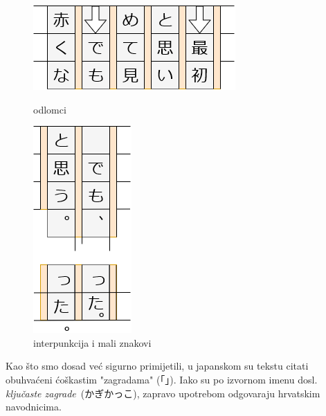 	\begin{figure}[h]
		\centering
		\begin{minipage}{.45\textwidth}
			\centering
			\includegraphics[width=.9\textwidth]{017_pisanje_res/a3.png}
			\caption{odlomci}
		\end{minipage}
		\begin{minipage}{.45\textwidth}
			\centering
			\includegraphics[width=.45\textwidth]{017_pisanje_res/a5.png}
			\caption{\centering interpunkcija i mali znakovi}
		\end{minipage}
	\end{figure}
	
	\newpage
	

	Kao što smo dosad već sigurno primijetili, u japanskom su tekstu citati obuhvaćeni ćoškastim "zagradama" (「」). Iako su po izvornom imenu dosl. \textit{ključaste zagrade}\ (かぎかっこ), zapravo upotrebom odgovaraju hrvatskim navodnicima.
	
